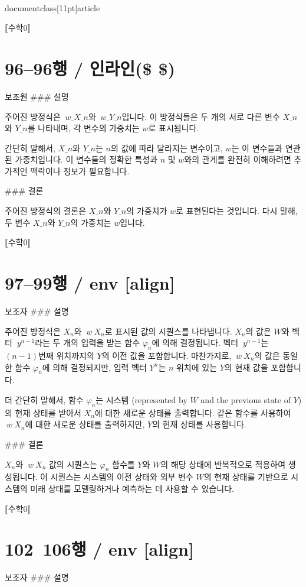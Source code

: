 \\documentclass[11pt]{article}
\begin{document}
⟦수학0⟧

\section*{96–96행 / 인라인(\$ \$) }
보조원
### 설명

주어진 방정식은 \(\ w\_{X\_n}\)와 \(\ w\_{Y\_n}\)입니다. 이 방정식들은 두 개의 서로 다른 변수 \(X\_n\)와 \(Y\_n\)를 나타내며, 각 변수의 가중치는 \(w\)로 표시됩니다.

간단히 말해서, \(X\_n\)와 \(Y\_n\)는 \(n\)의 값에 따라 달라지는 변수이고, \(w\)는 이 변수들과 연관된 가중치입니다. 이 변수들의 정확한 특성과 \(n\) 및 \(w\)와의 관계를 완전히 이해하려면 추가적인 맥락이나 정보가 필요합니다.

### 결론

주어진 방정식의 결론은 \(X\_n\)와 \(Y\_n\)의 가중치가 \(w\)로 표현된다는 것입니다. 다시 말해, 두 변수 \(X\_n\)와 \(Y\_n\)의 가중치는 \(w\)입니다.

⟦수학0⟧

\section*{97–99행 / env [align]}
보조자
### 설명

주어진 방정식은 \(X_n\)와 \(\ w\ X_n\)로 표시된 값의 시퀀스를 나타냅니다. \(X_n\)의 값은 \(W\)와 벡터 \(\ y^{n-1}\)라는 두 개의 입력을 받는 함수 \(\varphi_n\)에 의해 결정됩니다. 벡터 \(\ y^{n-1}\)는 \((n-1)\)번째 위치까지의 \(Y\)의 이전 값을 포함합니다. 마찬가지로, \(\ w\ X_n\)의 값은 동일한 함수 \(\varphi_n\)에 의해 결정되지만, 입력 벡터 \(Y^n\)는 \(n\) 위치에 있는 \(Y\)의 현재 값을 포함합니다.

더 간단히 말해서, 함수 \(\varphi_n\)는 시스템 (represented by \(W\) and the previous state of \(Y\))의 현재 상태를 받아서 \(X_n\)에 대한 새로운 상태를 출력합니다. 같은 함수를 사용하여 \(\ w\ X_n\)에 대한 새로운 상태를 출력하지만, \(Y\)의 현재 상태를 사용합니다.

### 결론

\(X_n\)와 \(\ w\ X_n\) 값의 시퀀스는 \(\varphi_n\) 함수를 \(Y\)와 \(W\)의 해당 상태에 반복적으로 적용하여 생성됩니다. 이 시퀀스는 시스템의 이전 상태와 외부 변수 \(W\)의 현재 상태를 기반으로 시스템의 미래 상태를 모델링하거나 예측하는 데 사용할 수 있습니다.

⟦수학0⟧

\section*{102~106행 / env [align]}
보조자
### 설명
\end{document}
